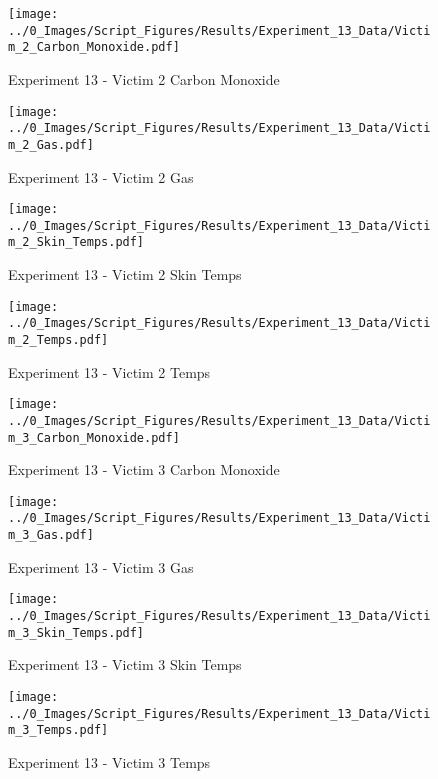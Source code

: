 	\begin{figure}[H]
		\centering
		\texttt{[image: ../0\_Images/Script\_Figures/Results/Experiment\_13\_Data/Victim\_2\_Carbon\_Monoxide.pdf]}
		\caption[]{Experiment 13 - Victim 2 Carbon Monoxide}
	\end{figure}
 
	\clearpage

	\begin{figure}[H]
		\centering
		\texttt{[image: ../0\_Images/Script\_Figures/Results/Experiment\_13\_Data/Victim\_2\_Gas.pdf]}
		\caption[]{Experiment 13 - Victim 2 Gas}
	\end{figure}
 

	\begin{figure}[H]
		\centering
		\texttt{[image: ../0\_Images/Script\_Figures/Results/Experiment\_13\_Data/Victim\_2\_Skin\_Temps.pdf]}
		\caption[]{Experiment 13 - Victim 2 Skin Temps}
	\end{figure}
 
	\clearpage

	\begin{figure}[H]
		\centering
		\texttt{[image: ../0\_Images/Script\_Figures/Results/Experiment\_13\_Data/Victim\_2\_Temps.pdf]}
		\caption[]{Experiment 13 - Victim 2 Temps}
	\end{figure}
 

	\begin{figure}[H]
		\centering
		\texttt{[image: ../0\_Images/Script\_Figures/Results/Experiment\_13\_Data/Victim\_3\_Carbon\_Monoxide.pdf]}
		\caption[]{Experiment 13 - Victim 3 Carbon Monoxide}
	\end{figure}
 
	\clearpage

	\begin{figure}[H]
		\centering
		\texttt{[image: ../0\_Images/Script\_Figures/Results/Experiment\_13\_Data/Victim\_3\_Gas.pdf]}
		\caption[]{Experiment 13 - Victim 3 Gas}
	\end{figure}
 

	\begin{figure}[H]
		\centering
		\texttt{[image: ../0\_Images/Script\_Figures/Results/Experiment\_13\_Data/Victim\_3\_Skin\_Temps.pdf]}
		\caption[]{Experiment 13 - Victim 3 Skin Temps}
	\end{figure}
 
	\clearpage

	\begin{figure}[H]
		\centering
		\texttt{[image: ../0\_Images/Script\_Figures/Results/Experiment\_13\_Data/Victim\_3\_Temps.pdf]}
		\caption[]{Experiment 13 - Victim 3 Temps}
	\end{figure}
 

